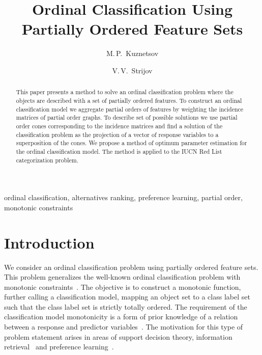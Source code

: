 \documentclass[12pt,preprint]{elsarticle}
\begin{document}
\title{Ordinal Classification Using Partially Ordered Feature Sets}

\author[mipt]{M.\,P.~Kuznetsov}
\author[mipt,ccas]{V.\,V.~Strijov}
\address[mipt]{Moscow Institute of Physics and Technology, Institutskiy lane 9, Dolgoprudny city, Moscow region, 141700, Russia}
\address[ccas]{Dorodnicyn Computing Center of Russian Academy of Sciences,  Vavilov st. 40, 119333 Moscow, Russia}

\begin{abstract}
This paper presents a method to solve an ordinal classification problem where the objects are described with a set of partially ordered features.
To construct an ordinal classification model we aggregate partial orders of features by weighting the incidence matrices of partial order graphs. To describe set of possible solutions we use partial order cones corresponding to the incidence matrices and find a solution of the classification problem as the projection of a vector of response variables to a superposition of the cones. We propose a method of optimum parameter estimation for the ordinal classification model. The method is applied to the IUCN Red List categorization problem.
\end{abstract}

\begin{keyword}
ordinal classification, alternatives ranking, preference learning, partial order, monotonic constraints
\end{keyword}

\maketitle

\section{Introduction}
We consider an ordinal classification problem using partially ordered feature sets. This problem generalizes the well-known ordinal classification problem with monotonic constraints~\cite{Kotlowski2013, Corrente2013}. The objective is to construct a monotonic function, further calling a classification model, mapping an object set to a class label set such that the class label set is strictly totally ordered. The requirement of the classification model monotonicity is a form of prior knowledge of a relation between a response and predictor variables~\cite{raey}. The motivation for this type of problem statement arises in areas of support decision theory, information retrieval~\cite{Schafer2007,Trotman2005,Spirin2011} and preference learning~\cite{Fuernkranz2011}.
\end{document}
